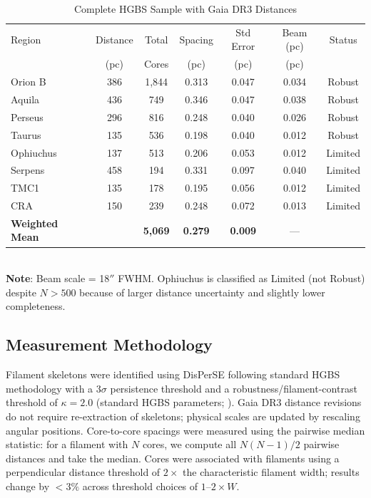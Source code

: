 \documentclass[twoside,twocolumn]{mnras}
\begin{document}
\begin{table}
\caption{Complete HGBS Sample with Gaia DR3 Distances}
\label{tab:sample}
\begin{tabular}{lcccccc}
\toprule
Region & Distance & Total & Spacing & Std Error & Beam (pc) & Status \\
       & (pc)   & Cores & (pc)   & (pc)      & (pc) & \\
\midrule
Orion B  & 386 & 1,844 & 0.313 & 0.047 & 0.034 & Robust \\
Aquila   & 436 & 749   & 0.346 & 0.047 & 0.038 & Robust \\
Perseus  & 296 & 816   & 0.248 & 0.040 & 0.026 & Robust \\
Taurus   & 135 & 536   & 0.198 & 0.040 & 0.012 & Robust \\
Ophiuchus& 137 & 513   & 0.206 & 0.053 & 0.012 & Limited \\
Serpens  & 458 & 194   & 0.331 & 0.097 & 0.040 & Limited \\
TMC1     & 135 & 178   & 0.195 & 0.056 & 0.012 & Limited \\
CRA      & 150 & 239   & 0.248 & 0.072 & 0.013 & Limited \\
\midrule
\textbf{Weighted Mean} &  & \textbf{5,069} & \textbf{0.279} & \textbf{0.009} & --- &  \\
\bottomrule
\end{tabular}
\\ \footnotesize \textbf{Note}: Beam scale = 18$''$ FWHM. Ophiuchus is classified as Limited (not Robust) despite $N>500$ because of larger distance uncertainty and slightly lower completeness.
\end{table}

\subsection{Measurement Methodology}

Filament skeletons were identified using DisPerSE \citep{Sousbie2011} following standard
HGBS methodology with a $3\sigma$ persistence threshold and a robustness/filament-contrast
threshold of $\kappa = 2.0$ (standard HGBS parameters; \citealt{Arzoumanian2011}). Gaia DR3 distance revisions
do not require re-extraction of skeletons; physical scales are updated by rescaling
angular positions. Core-to-core spacings were measured using the pairwise median
statistic: for a filament with $N$ cores, we compute all $N(N-1)/2$ pairwise distances
and take the median. Cores were associated with filaments using a perpendicular
distance threshold of $2\times$ the characteristic filament width; results change
by $<3\%$ across threshold choices of $1$--$2\times W$.
\end{document}
